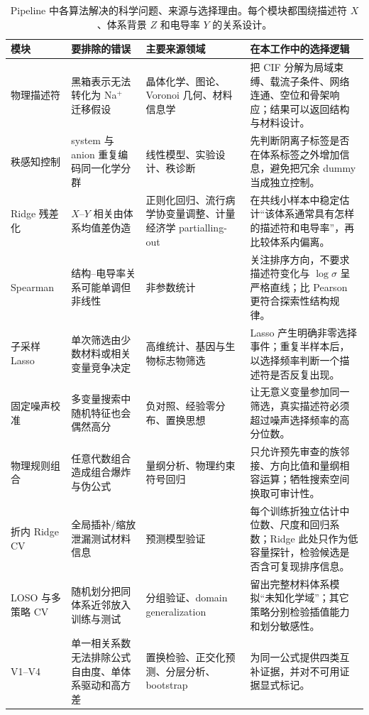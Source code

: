 \begin{table}[htbp]
\centering
\caption{Pipeline 中各算法解决的科学问题、来源与选择理由。每个模块都围绕描述符 $X$、体系背景 $Z$ 和电导率 $Y$ 的关系设计。}
\label{tab:rationale}
\small
\begin{tabularx}{\textwidth}{@{}p{}p{}p{}X@{}}
\toprule
模块 & 要排除的错误 & 主要来源领域 & 在本工作中的选择逻辑 \\
\midrule
物理描述符 & 黑箱表示无法转化为 Na$^+$ 迁移假设 & 晶体化学、图论、Voronoi 几何、材料信息学 & 把 CIF 分解为局域束缚、载流子条件、网络连通、空位和骨架响应；结果可以返回结构与材料设计。 \\
秩感知控制 & system 与 anion 重复编码同一化学分群 & 线性模型、实验设计、秩诊断 & 先判断阴离子标签是否在体系标签之外增加信息，避免把冗余 dummy 当成独立控制。 \\
Ridge 残差化 & $X$--$Y$ 相关由体系均值差伪造 & 正则化回归、流行病学协变量调整、计量经济学 partialling-out & 在共线小样本中稳定估计“该体系通常具有怎样的描述符和电导率”，再比较体系内偏离。 \\
Spearman & 结构--电导率关系可能单调但非线性 & 非参数统计 & 关注排序方向，不要求描述符变化与 $\log\sigma$ 呈严格直线；比 Pearson 更符合探索性结构规律。 \\
子采样 Lasso & 单次筛选由少数材料或相关变量竞争决定 & 高维统计、基因与生物标志物筛选 & Lasso 产生明确非零选择事件；重复半样本后，以选择频率判断一个描述符是否反复出现。 \\
固定噪声校准 & 多变量搜索中随机特征也会偶然高分 & 负对照、经验零分布、置换思想 & 让无意义变量参加同一筛选，真实描述符必须超过噪声选择频率的高分位数。 \\
物理规则组合 & 任意代数组合造成组合爆炸与伪公式 & 量纲分析、物理约束符号回归 & 只允许预先审查的族邻接、方向比值和量纲相容运算；牺牲搜索空间换取可审计性。 \\
折内 Ridge CV & 全局插补/缩放泄漏测试材料信息 & 预测模型验证 & 每个训练折独立估计中位数、尺度和回归系数；Ridge 此处只作为低容量探针，检验候选是否含可复现排序信息。 \\
LOSO 与多策略 CV & 随机划分把同体系近邻放入训练与测试 & 分组验证、domain generalization & 留出完整材料体系模拟“未知化学域”；其它策略分别检验插值能力和划分敏感性。 \\
V1--V4 & 单一相关系数无法排除公式自由度、单体系驱动和高方差 & 置换检验、正交化预测、分层分析、bootstrap & 为同一公式提供四类互补证据，并对不可用证据显式标记。 \\
\bottomrule
\end{tabularx}
\end{table}
